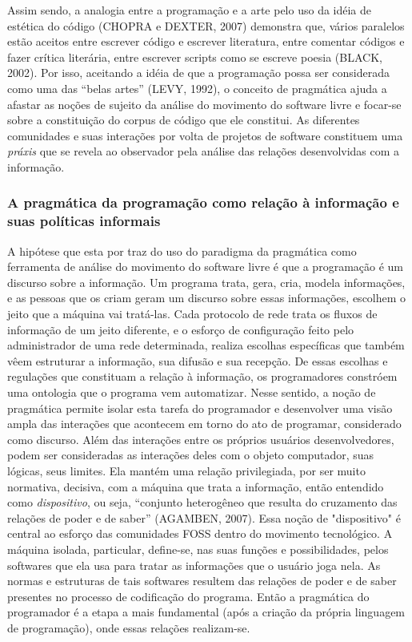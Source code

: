 Assim sendo, a analogia entre a programação e a arte pelo uso da idéia de estética do código (CHOPRA e DEXTER, 2007) demonstra que, vários paralelos estão aceitos entre escrever código e escrever literatura, entre comentar códigos e fazer crítica literária, entre escrever scripts como se escreve poesia (BLACK, 2002). Por isso, aceitando a idéia de que a programação possa ser considerada como uma das “belas artes” (LEVY, 1992), o conceito de pragmática ajuda a afastar as noções de sujeito da análise do movimento do software livre e focar-se sobre a constituição do corpus de código que ele constitui. As diferentes comunidades e suas interações por volta de projetos de software constituem uma \emph{práxis} que se revela ao observador pela análise das relações desenvolvidas com a informação.

\subsubsection{A pragmática da programação como relação à informação e suas políticas informais} \label{2.3.2.b}

A hipótese que esta por traz do uso do paradigma da pragmática como ferramenta de análise do movimento do software livre é que a programação é um discurso sobre a informação. Um programa trata, gera, cria, modela informações, e as pessoas que os criam geram um discurso sobre essas informações, escolhem o jeito que a máquina vai tratá-las. Cada protocolo de rede trata os fluxos de informação de um jeito diferente, e o esforço de configuração feito pelo administrador de uma rede determinada, realiza escolhas específicas que também vêem estruturar a informação, sua difusão e sua recepção. De essas escolhas e regulações que constituam a relação à informação, os programadores constróem uma ontologia que o programa vem automatizar. Nesse sentido, a noção de pragmática permite isolar esta tarefa do programador e desenvolver uma visão ampla das interações que acontecem em torno do ato de programar, considerado como discurso. Além das interações entre os próprios usuários desenvolvedores, podem ser consideradas as interações deles com o objeto computador, suas lógicas, seus limites. Ela mantém uma relação privilegiada, por ser muito normativa, decisiva, com a máquina que trata a informação, então entendido como \emph{dispositivo}, ou seja, “conjunto heterogêneo que resulta do cruzamento das relações de poder e de saber” (AGAMBEN, 2007). Essa noção de "dispositivo" é central ao esforço das comunidades FOSS dentro do movimento tecnológico. A máquina isolada, particular, define-se, nas suas funções e possibilidades, pelos softwares que ela usa para tratar as informações que o usuário joga nela. As normas e estruturas de tais softwares resultem das relações de poder e de saber presentes no processo de codificação do programa. Então a pragmática do programador é a etapa a mais fundamental (após a criação da própria linguagem de programação), onde essas relações realizam-se.

